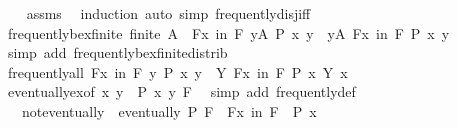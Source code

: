 \begin{isabellebody}
%
\isadelimproof
\ \ %
\endisadelimproof
%
\isatagproof
{}\isamarkupfalse%
\ assms\ \isamarkupfalse%
\ induction\ {\isacharparenleft}{\kern0pt}auto\ simp{\isacharcolon}{\kern0pt}\ frequently{\isacharunderscore}{\kern0pt}disj{\isacharunderscore}{\kern0pt}iff{\isacharparenright}{\kern0pt}%
\endisatagproof
{\isafoldproof}%
%
\isadelimproof
\isanewline
%
\endisadelimproof
\isanewline
{}\isamarkupfalse%
\ frequently{\isacharunderscore}{\kern0pt}bex{\isacharunderscore}{\kern0pt}finite{\isacharcolon}{\kern0pt}\ {\isachardoublequoteopen}finite\ A\ {\isasymLongrightarrow}\ {\isasymexists}\isactrlsub Fx\ in\ F{\isachardot}{\kern0pt}\ {\isasymexists}y{\isasymin}A{\isachardot}{\kern0pt}\ P\ x\ y\ {\isasymLongrightarrow}\ {\isasymexists}y{\isasymin}A{\isachardot}{\kern0pt}\ {\isasymexists}\isactrlsub Fx\ in\ F{\isachardot}{\kern0pt}\ P\ x\ y{\isachardoublequoteclose}\isanewline
%
\isadelimproof
\ \ %
\endisadelimproof
%
\isatagproof
{}\isamarkupfalse%
\ {\isacharparenleft}{\kern0pt}simp\ add{\isacharcolon}{\kern0pt}\ frequently{\isacharunderscore}{\kern0pt}bex{\isacharunderscore}{\kern0pt}finite{\isacharunderscore}{\kern0pt}distrib{\isacharparenright}{\kern0pt}%
\endisatagproof
{\isafoldproof}%
%
\isadelimproof
\isanewline
%
\endisadelimproof
\isanewline
{}\isamarkupfalse%
\ frequently{\isacharunderscore}{\kern0pt}all{\isacharcolon}{\kern0pt}\ {\isachardoublequoteopen}{\isacharparenleft}{\kern0pt}{\isasymexists}\isactrlsub Fx\ in\ F{\isachardot}{\kern0pt}\ {\isasymforall}y{\isachardot}{\kern0pt}\ P\ x\ y{\isacharparenright}{\kern0pt}\ {\isasymlongleftrightarrow}\ {\isacharparenleft}{\kern0pt}{\isasymforall}Y{\isachardot}{\kern0pt}\ {\isasymexists}\isactrlsub Fx\ in\ F{\isachardot}{\kern0pt}\ P\ x\ {\isacharparenleft}{\kern0pt}Y\ x{\isacharparenright}{\kern0pt}{\isacharparenright}{\kern0pt}{\isachardoublequoteclose}\isanewline
%
\isadelimproof
\ \ %
\endisadelimproof
%
\isatagproof
{}\isamarkupfalse%
\ eventually{\isacharunderscore}{\kern0pt}ex{\isacharbrackleft}{\kern0pt}of\ {\isachardoublequoteopen}{\isasymlambda}x\ y{\isachardot}{\kern0pt}\ {\isasymnot}\ P\ x\ y{\isachardoublequoteclose}\ F{\isacharbrackright}{\kern0pt}\ \isamarkupfalse%
\ {\isacharparenleft}{\kern0pt}simp\ add{\isacharcolon}{\kern0pt}\ frequently{\isacharunderscore}{\kern0pt}def{\isacharparenright}{\kern0pt}%
\endisatagproof
{\isafoldproof}%
%
\isadelimproof
\isanewline
%
\endisadelimproof
\isanewline
{}\isamarkupfalse%
\isanewline
\ \ \ not{\isacharunderscore}{\kern0pt}eventually{\isacharcolon}{\kern0pt}\ {\isachardoublequoteopen}{\isasymnot}\ eventually\ P\ F\ {\isasymlongleftrightarrow}\ {\isacharparenleft}{\kern0pt}{\isasymexists}\isactrlsub Fx\ in\ F{\isachardot}{\kern0pt}\ {\isasymnot}\ P\ x{\isacharparenright}{\kern0pt}{\isachardoublequoteclose}\isanewline

\end{isabellebody}
